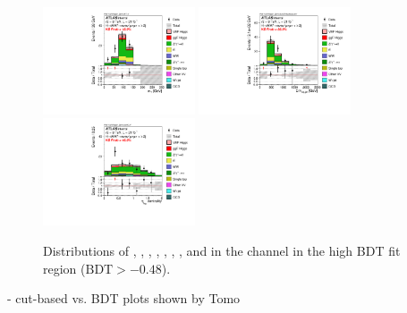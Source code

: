 \begin{figure}[hb!]
   \includegraphics[width=0.4\textwidth]{fig/analysis/BDTinputVarsInSR/SF_SR_FitRegion_MT_tr_mh125_lin.pdf}
   \includegraphics[width=0.4\textwidth]{fig/analysis/BDTinputVarsInSR/SF_SR_FitRegion_SumOFMvaMLepxJety_mh125_lin.pdf}
   \includegraphics[width=0.4\textwidth]{fig/analysis/BDTinputVarsInSR/SF_SR_FitRegion_contOLV_mh125_lin.pdf}
   \caption{Distributions
   of \dphill, \mll, \dyjj, \mjj, \pTtot, \mT, \SumMlj, and
   \lepEtaCent
   in the \eemm channel in the high BDT fit region ($\textrm{BDT} > -0.48$).}
  \label{chap:analysis:fig:bdt_inputs_sr_sf}
\end{figure}

- cut-based vs. BDT plots shown by Tomo


